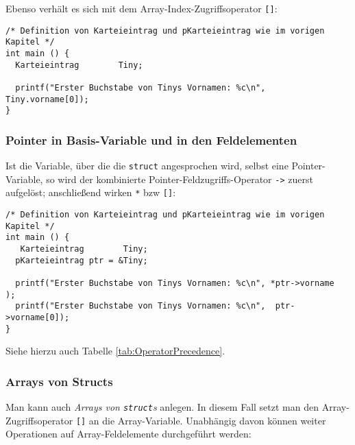 Ebenso verhält es sich mit dem Array-Index-Zugriffsoperator \texttt{[]}:
\begin{codebox}
\begin{verbatim}
/* Definition von Karteieintrag und pKarteieintrag wie im vorigen Kapitel */
int main () {
  Karteieintrag        Tiny;

  printf("Erster Buchstabe von Tinys Vornamen: %c\n", Tiny.vorname[0]);
}
\end{verbatim}
\end{codebox}

\subsubsection{Pointer in Basis-Variable und in den Feldelementen}
Ist die Variable, über die die \texttt{struct} angesprochen wird, selbst eine Pointer-Variable, so wird der kombinierte Pointer-Feldzugriffs-Operator \texttt{->} zuerst aufgelöst; anschließend wirken \texttt{*} bzw \texttt{[]}:

\begin{codebox}
\begin{verbatim}
/* Definition von Karteieintrag und pKarteieintrag wie im vorigen Kapitel */
int main () {
   Karteieintrag        Tiny;
  pKarteieintrag ptr = &Tiny;

  printf("Erster Buchstabe von Tinys Vornamen: %c\n", *ptr->vorname   );
  printf("Erster Buchstabe von Tinys Vornamen: %c\n",  ptr->vorname[0]);
}
\end{verbatim}
\end{codebox}

Siehe hierzu auch Tabelle \ref{tab:OperatorPrecedence}.

\subsubsection{Arrays von Structs}
Man kann auch \emph{Arrays von \texttt{struct}s} anlegen. In diesem Fall setzt man den Array-Zugriffsoperator \texttt{[]} an die Array-Variable. Unabhängig davon können weiter Operationen auf Array-Feldelemente durchgeführt werden:

